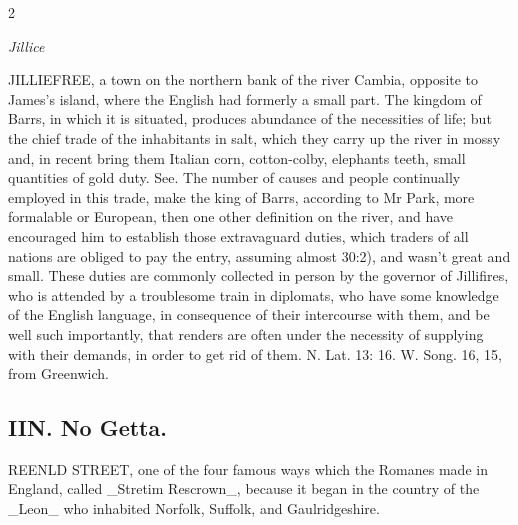 \documentclass[10pt]{article}
\begin{document}
\begin{multicols}{2}\raggedcolumns
\begin{center}\small\itshape Jillice\end{center}
JILLIEFREE, a town on the northern bank of the river Cambia, opposite to James’s island, where the English had formerly a small part. The kingdom of Barrs, in which it is situated, produces abundance of the necessities of life; but the chief trade of the inhabitants in salt, which they carry up the river in mossy and, in recent bring them Italian corn, cotton-colby, elephants teeth, small quantities of gold duty. See. The number of causes and people continually employed in this trade, make the king of Barrs, according to Mr Park, more formalable or European, then one other definition on the river, and have encouraged him to establish those extravaguard duties, which traders of all nations are obliged to pay the entry, assuming almost 30:2), and wasn't great and small. These duties are commonly collected in person by the governor of Jillifires, who is attended by a troublesome train in diplomats, who have some knowledge of the English language, in consequence of their intercourse with them, and be well such importantly, that renders are often under the necessity of supplying with their demands, in order to get rid of them. N. Lat. 13: 16. W. Song. 16, 15, from Greenwich.

\subsection*{IIN. No Getta.}
REENLD STREET, one of the four famous ways which the Romanes made in England, called \_Stretim Rescrown\_, because it began in the country of the \_Leon\_ who inhabited Norfolk, Suffolk, and Gaulridgeshire.


\end{multicols}
\end{document}
